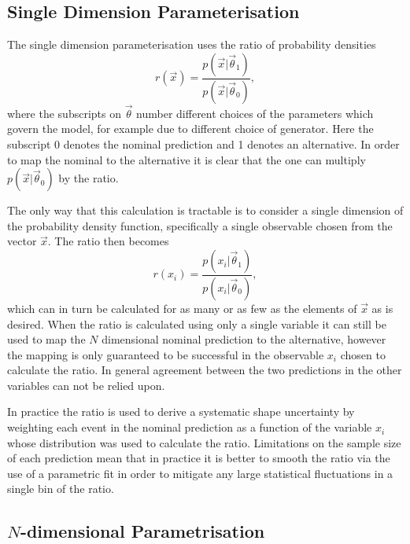 \subsection{Single Dimension Parameterisation}
\label{sec:1D-reweight}

The single dimension parameterisation uses the ratio of probability densities
\begin{equation}
  r(\vec{x}) = \frac{p(\vec{x}|\vec{\theta}_{1})}{p(\vec{x}|\vec{\theta}_{0})},
  \label{eq:DensityRatio}
\end{equation}
where the subscripts on $\vec{\theta}$ number different choices of the
parameters which govern the model, for example due to different choice of
generator. Here the subscript 0 denotes the nominal prediction and 1 denotes an
alternative. In order to map the nominal to the alternative it is clear that the
one can multiply $p(\vec{x}|\vec{\theta}_{0})$ by the ratio.

The only way that this calculation is tractable is to consider a single
dimension of the probability density function, specifically a single observable
chosen from the vector $\vec{x}$. The ratio then becomes
\begin{equation}
  r(x_{i}) = \frac{p(x_{i}|\vec{\theta}_{1})}{p(x_{i}|\vec{\theta}_{0})},
  \label{eq:1D-ratio}
\end{equation}
which can in turn be calculated for as many or as few as the elements of
$\vec{x}$ as is desired. When the ratio is calculated using only a single
variable it can still be used to map the $N$ dimensional nominal prediction to
the alternative, however the mapping is only guaranteed to be successful in the
observable $x_i$ chosen to calculate the ratio. In general agreement between the two
predictions in the other variables can not be relied upon.

In practice the ratio is used to derive a systematic shape uncertainty by
weighting each event in the nominal prediction as a function of the variable
$x_{i}$ whose distribution was used to calculate the ratio. Limitations on the
sample size of each prediction mean that in practice it is better to smooth the
ratio via the use of a parametric fit in order to mitigate any large statistical
fluctuations in a single bin of the ratio.

\subsection{$N$-dimensional Parametrisation}
\label{sec:ND-reweight}

